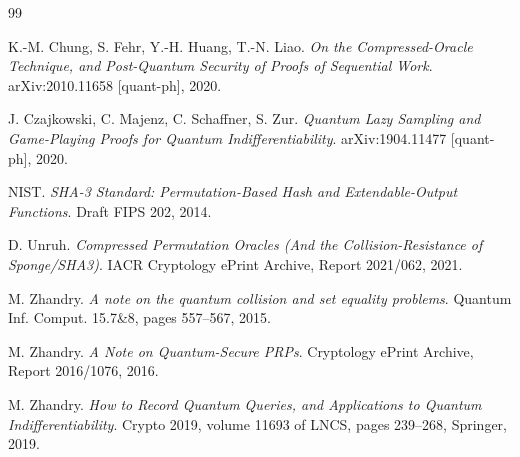 \documentclass{aicr-conjecture}
\begin{document}
\begin{aicrbibliography}{99}

K.-M. Chung, S. Fehr, Y.-H. Huang, T.-N. Liao.
\emph{On the Compressed-Oracle Technique, and Post-Quantum Security of
Proofs of Sequential Work}.
arXiv:2010.11658 [quant-ph], 2020.

J. Czajkowski, C. Majenz, C. Schaffner, S. Zur.
\emph{Quantum Lazy Sampling and Game-Playing Proofs for Quantum
Indifferentiability}.
arXiv:1904.11477 [quant-ph], 2020.

NIST.
\emph{SHA-3 Standard: Permutation-Based Hash and Extendable-Output
Functions}.
Draft FIPS 202, 2014.

D. Unruh.
\emph{Compressed Permutation Oracles (And the Collision-Resistance of
Sponge/SHA3)}.
IACR Cryptology ePrint Archive, Report 2021/062, 2021.

M. Zhandry.
\emph{A note on the quantum collision and set equality problems}.
Quantum Inf. Comput. 15.7\&8, pages 557--567, 2015.

M. Zhandry.
\emph{A Note on Quantum-Secure PRPs}.
Cryptology ePrint Archive, Report 2016/1076, 2016.

M. Zhandry.
\emph{How to Record Quantum Queries, and Applications to Quantum
Indifferentiability}.
Crypto 2019, volume 11693 of LNCS, pages 239--268, Springer, 2019.

\end{aicrbibliography}
\end{document}

